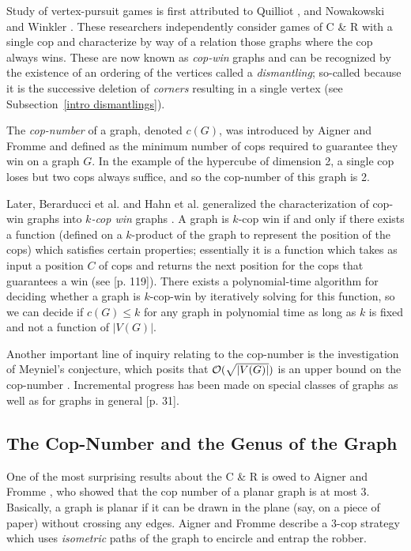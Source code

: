 Study of vertex-pursuit games is first attributed to Quilliot \cite{quilliot1978jeux, quilliot1983problemes}, and Nowakowski and Winkler \cite{nowakowski1983vertex}.
These researchers independently consider games of C \& R with a single cop and characterize by way of a relation those graphs where the cop always wins. These are now known as \textit{cop-win} graphs
and can be recognized by the existence of an ordering of the vertices called a \textit{dismantling};
so-called because it is the successive deletion of \textit{corners} resulting in a single vertex (see Subsection~\ref{intro dismantlings}).

The \textit{cop-number} of a graph, denoted $c(G)$, was introduced by Aigner and Fromme  \cite{aigner1984game} and defined as the minimum number of cops required
to guarantee they win on a graph $G$. In the example of the hypercube of dimension 2, a single cop loses but two cops always suffice, and so the cop-number of this graph is 2.

Later, Berarducci et al. and Hahn et al. generalized the characterization of cop-win graphs
into \textit{$k$-cop win} graphs \cite{berarducci1993cop, hahn2003characterisation}. A graph is $k$-cop win if and only if there exists a function (defined on a $k$-product of the graph to represent the position of the cops) which satisfies certain properties; essentially it is a function which takes as input a position $C$ of cops and returns the next position for the cops that guarantees a win (see \cite{bonato2011game}[p. 119]).
There exists a polynomial-time algorithm for deciding whether a graph is $k$-cop-win by iteratively
solving for this function, so we can decide if $c(G) \leq k$ for any graph in polynomial time as long as $k$ is fixed and not a function of $\lvert V(G) \rvert$.

Another important line of inquiry relating to the cop-number is the investigation of Meyniel's conjecture, which posits that $\mathcal{O}(\sqrt{\lvert V(G)\rvert })$ is an upper bound on the cop-number \cite{frankl1987cops}.
Incremental progress has been made on special classes of graphs as well as for graphs in general  \cite{gera2016graph}[p. 31].

\subsection{The Cop-Number and the Genus of the Graph}

One of the most surprising results about the C \& R is owed to Aigner and Fromme \cite{aigner1984game}, who showed that the cop number of a planar graph is at most 3.
Basically, a graph is planar if it can be drawn in the plane (say, on a piece of paper) without crossing any edges. Aigner and Fromme describe a 3-cop strategy which uses \textit{isometric} paths of the graph to encircle and entrap the robber.

